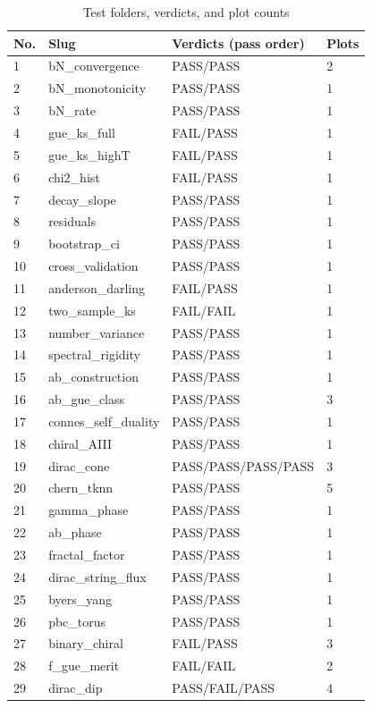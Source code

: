 \documentclass[10pt]{article}
\begin{document}
\begin{table}[htbp]
\centering
\small
\caption{Test folders, verdicts, and plot counts}
\begin{tabular}{llll}
\toprule
\textbf{No.} & \textbf{Slug} & \textbf{Verdicts (pass order)} & \textbf{Plots} \\
\midrule
1 & bN\_convergence & PASS/PASS & 2 \\
2 & bN\_monotonicity & PASS/PASS & 1 \\
3 & bN\_rate & PASS/PASS & 1 \\
4 & gue\_ks\_full & FAIL/PASS & 1 \\
5 & gue\_ks\_highT & FAIL/PASS & 1 \\
6 & chi2\_hist & FAIL/PASS & 1 \\
7 & decay\_slope & PASS/PASS & 1 \\
8 & residuals & PASS/PASS & 1 \\
9 & bootstrap\_ci & PASS/PASS & 1 \\
10 & cross\_validation & PASS/PASS & 1 \\
11 & anderson\_darling & FAIL/PASS & 1 \\
12 & two\_sample\_ks & FAIL/FAIL & 1 \\
13 & number\_variance & PASS/PASS & 1 \\
14 & spectral\_rigidity & PASS/PASS & 1 \\
15 & ab\_construction & PASS/PASS & 1 \\
16 & ab\_gue\_class & PASS/PASS & 3 \\
17 & connes\_self\_duality & PASS/PASS & 1 \\
18 & chiral\_AIII & PASS/PASS & 1 \\
19 & dirac\_cone & PASS/PASS/PASS/PASS & 3 \\
20 & chern\_tknn & PASS/PASS & 5 \\
21 & gamma\_phase & PASS/PASS & 1 \\
22 & ab\_phase & PASS/PASS & 1 \\
23 & fractal\_factor & PASS/PASS & 1 \\
24 & dirac\_string\_flux & PASS/PASS & 1 \\
25 & byers\_yang & PASS/PASS & 1 \\
26 & pbc\_torus & PASS/PASS & 1 \\
27 & binary\_chiral & FAIL/PASS & 3 \\
28 & f\_gue\_merit & FAIL/FAIL & 2 \\
29 & dirac\_dip & PASS/FAIL/PASS & 4 \\

\end{tabular}
\end{table}
\end{document}
